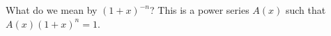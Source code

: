 

\setcounter{section}{2}
\setcounter{subsection}{4}
\setcounter{dfn}{13}


What do we mean by $(1+x)^{-n}$?
This is a power series $A(x)$ such that $A(x) (1+x)^n = 1$.


